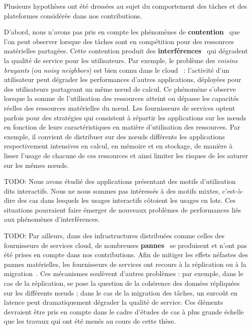 Plusieurs hypothèses ont été dressées au sujet du comportement des tâches et des plateformes considérée dans nos contributions.

D'abord, nous n'avons pas pris en compte les phénomènes de \textbf{contention}~\cite{vanbeekCPUContentionPredictor2019, jacquetSweetspotVMOversubscribingCPU} que l'on peut observer lorsque des tâches sont en compétition pour des ressources matérielles partagées. Cette contention produit des \textbf{interférences}~\cite{kohAnalysisPerformanceInterference2007, vardasImprovedParallelApplication} qui dégradent la qualité de service pour les utilisateurs. Par exemple, le problème des \textit{voisins bruyants} (ou \textit{noisy neighbors}) est bien connu dans le cloud~\cite{robbagbyAntimodeleVoisinBruyant} : l'activité d'un utilisateur peut dégrader les performances d'autres applications, déployées pour des utilisateurs partageant un même nœud de calcul. Ce phénomène s'observe lorsque la somme de l'utilisation des ressources atteint ou dépasse les capacités réelles des ressources matérielles du nœud. Les fournisseurs de services optent parfois pour des stratégies qui consistent à répartir les applications sur les nœuds en fonction de leurs caractéristiques en matière d'utilisation des ressources. Par exemple, il convient de distribuer sur des nœuds différents les applications respectivement intensives en calcul, en mémoire et en stockage, de manière à lisser l'usage de chacune de ces ressources et ainsi limiter les risques de les saturer sur les mêmes nœuds.

TODO: Nous avons étudié des applications présentant des motifs d'utilisation dits interactifs. Nous ne nous sommes pas intéressés à des motifs mixtes, c'est-à-dire des cas dans lesquels les usages interactifs côtoient les usages en lots. Ces situations pourraient faire émerger de nouveaux problèmes de performances liés aux phénomènes d'interférences.

TODO: Par ailleurs, dans des infrastructures distribuées comme celles des fournisseurs de services cloud, de nombreuses \textbf{pannes}~\cite{javadiFailureTraceArchive2013, galletModelSpaceCorrelatedFailures2010, BareMetal70B} se produisent et n'ont pas été prises en compte dans nos contributions. Afin de mitiger les effets néfastes des pannes matérielles, les fournisseurs de services ont recours à la réplication ou à la migration~\cite{nazaricheraghlouSurveyFaultTolerance2016}. Ces mécanismes soulèvent d'autres problèmes : par exemple, dans le cas de la réplication, se pose la question de la cohérence des données répliquées sur les différents nœuds ; dans le cas de la migration des tâches, un surcoût en latence peut dramatiquement dégrader la qualité de service. Ces éléments devraient être pris en compte dans le cadre d'études de cas à plus grande échelle que les travaux qui ont été menés au cours de cette thèse.

